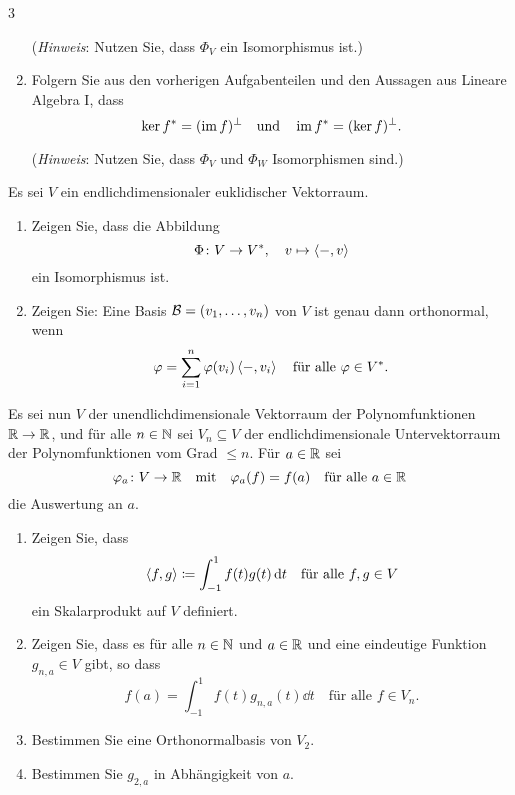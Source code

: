 \begin{question}[subtitle = Zusammenhang zwischen Skalarproduktraum und Dualraum]{3}
\begin{enumerate}[leftmargin=*, resume]
      (\emph{Hinweis}:
       Nutzen Sie, dass $\Phi_V$ ein Isomorphismus ist.)
    \item
      Folgern Sie aus den vorherigen Aufgabenteilen und den Aussagen aus Lineare Algebra I, dass
      \[
          \ker f^*
        = (\operatorname{im} f)^\perp
        \quad\text{und}\quad
          \operatorname{im} f^*
        = (\ker f)^\perp.
      \]
      
      (\emph{Hinweis}:
       Nutzen Sie, dass $\Phi_V$ und $\Phi_W$ Isomorphismen sind.)
  \end{enumerate}
\end{question}


\begin{question}[subtitle = Eine Anwendung des Rieszschen Darstellungssatzes]{3}
  Es sei $V$ ein endlichdimensionaler euklidischer Vektorraum.
  \begin{enumerate}[leftmargin=*]
    \item
      Zeigen Sie, dass die Abbildung
      \[
        \Phi \colon V \to V^*,
        \quad
        v \mapsto \left\langle -,v \right\rangle
      \]
      ein Isomorphismus ist.
    \item
      Zeigen Sie:
      Eine Basis $\mathcal{B} = (v_1, \dotsc, v_n)$ von $V$ ist genau dann orthonormal, wenn
      \[
          \varphi
        = \sum_{i=1}^n \varphi(v_i) \left\langle -,v_i \right\rangle
        \quad
        \text{für alle $\varphi \in V^*$}.
      \]
  \end{enumerate}
  Es sei nun $V$ der unendlichdimensionale Vektorraum der Polynomfunktionen $\mathbb{R} \to \mathbb{R}$, und für alle $n \in \mathbb{N}$ sei $V_n \subseteq V$ der endlichdimensionale Untervektorraum der Polynomfunktionen vom Grad $\leq n$.
  Für $a \in \mathbb{R}$ sei
  \[
    \varphi_a \colon V \to \mathbb{R}
    \quad\text{mit}\quad
    \varphi_a(f) = f(a)
    \quad
    \text{für alle $a \in \mathbb{R}$}
  \]
  die Auswertung an $a$.
  \begin{enumerate}[leftmargin=*, resume]
    \item
      Zeigen Sie, dass
      \[
        \left\langle f, g \right\rangle \coloneqq \int_{-1}^1 f(t)g(t) \,\text{d}t
        \quad
        \text{für alle $f, g \in V$}
      \]
      ein Skalarprodukt auf $V$ definiert.
    \item
      Zeigen Sie, dass es für alle $n \in \mathbb{N}$ und $a \in \mathbb{R}$ und eine eindeutige Funktion $g_{n,a} \in V$ gibt, so dass
      \[
          f(a)
        = \int_{-1}^1 f(t) g_{n,a}(t) \dd{t}
        \quad
        \text{für alle $f \in V_n$}.
      \]
    \item
      Bestimmen Sie eine Orthonormalbasis von $V_2$.
    \item
      Bestimmen Sie $g_{2,a}$ in Abhängigkeit von $a$.
  \end{enumerate}
\end{question}


